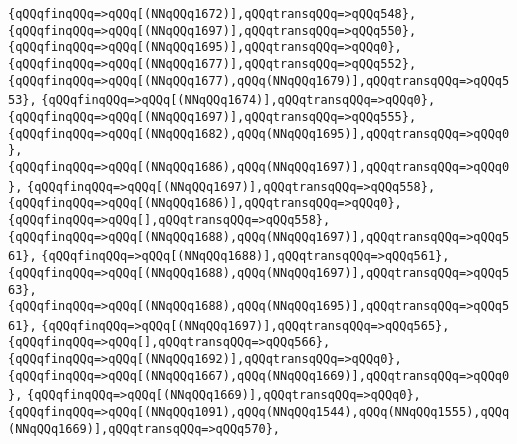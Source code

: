 \verb|{qQQqfinqQQq=>qQQq[(NNqQQq1672)],qQQqtransqQQq=>qQQq548},|\newline
\verb|{qQQqfinqQQq=>qQQq[(NNqQQq1697)],qQQqtransqQQq=>qQQq550},|\newline
\verb|{qQQqfinqQQq=>qQQq[(NNqQQq1695)],qQQqtransqQQq=>qQQq0},|\newline
\verb|{qQQqfinqQQq=>qQQq[(NNqQQq1677)],qQQqtransqQQq=>qQQq552},|\newline
\verb|{qQQqfinqQQq=>qQQq[(NNqQQq1677),qQQq(NNqQQq1679)],qQQqtransqQQq=>qQQq553},|\newline
\verb|{qQQqfinqQQq=>qQQq[(NNqQQq1674)],qQQqtransqQQq=>qQQq0},|\newline
\verb|{qQQqfinqQQq=>qQQq[(NNqQQq1697)],qQQqtransqQQq=>qQQq555},|\newline
\verb|{qQQqfinqQQq=>qQQq[(NNqQQq1682),qQQq(NNqQQq1695)],qQQqtransqQQq=>qQQq0},|\newline
\verb|{qQQqfinqQQq=>qQQq[(NNqQQq1686),qQQq(NNqQQq1697)],qQQqtransqQQq=>qQQq0},|\newline
\verb|{qQQqfinqQQq=>qQQq[(NNqQQq1697)],qQQqtransqQQq=>qQQq558},|\newline
\verb|{qQQqfinqQQq=>qQQq[(NNqQQq1686)],qQQqtransqQQq=>qQQq0},|\newline
\verb|{qQQqfinqQQq=>qQQq[],qQQqtransqQQq=>qQQq558},|\newline
\verb|{qQQqfinqQQq=>qQQq[(NNqQQq1688),qQQq(NNqQQq1697)],qQQqtransqQQq=>qQQq561},|\newline
\verb|{qQQqfinqQQq=>qQQq[(NNqQQq1688)],qQQqtransqQQq=>qQQq561},|\newline
\verb|{qQQqfinqQQq=>qQQq[(NNqQQq1688),qQQq(NNqQQq1697)],qQQqtransqQQq=>qQQq563},|\newline
\verb|{qQQqfinqQQq=>qQQq[(NNqQQq1688),qQQq(NNqQQq1695)],qQQqtransqQQq=>qQQq561},|\newline
\verb|{qQQqfinqQQq=>qQQq[(NNqQQq1697)],qQQqtransqQQq=>qQQq565},|\newline
\verb|{qQQqfinqQQq=>qQQq[],qQQqtransqQQq=>qQQq566},|\newline
\verb|{qQQqfinqQQq=>qQQq[(NNqQQq1692)],qQQqtransqQQq=>qQQq0},|\newline
\verb|{qQQqfinqQQq=>qQQq[(NNqQQq1667),qQQq(NNqQQq1669)],qQQqtransqQQq=>qQQq0},|\newline
\verb|{qQQqfinqQQq=>qQQq[(NNqQQq1669)],qQQqtransqQQq=>qQQq0},|\newline
\verb|{qQQqfinqQQq=>qQQq[(NNqQQq1091),qQQq(NNqQQq1544),qQQq(NNqQQq1555),qQQq(NNqQQq1669)],qQQqtransqQQq=>qQQq570},|\newline
